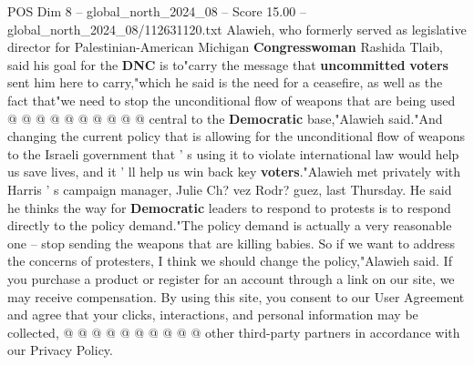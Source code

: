 \begin{textsample}{POS Dim 8 – global\_north\_2024\_08 – Score 15.00 – global\_north\_2024\_08/112631120.txt}
Alawieh, who formerly served as legislative director for Palestinian-American Michigan \textbf{Congresswoman} Rashida Tlaib, said his goal for the \textbf{DNC} is to"carry the message that \textbf{uncommitted} \textbf{voters} sent him here to carry,"which he said is the need for a ceasefire, as well as the fact that"we need to stop the unconditional flow of weapons that are being used @ @ @ @ @ @ @ @ @ @ central to the \textbf{Democratic} base,"Alawieh said."And changing the current policy that is allowing for the unconditional flow of weapons to the Israeli government that ' s using it to violate international law would help us save lives, and it ' ll help us win back key \textbf{voters}."Alawieh met privately with Harris ' s campaign manager, Julie Ch? vez Rodr? guez, last Thursday.
He said he thinks the way for \textbf{Democratic} leaders to respond to protests is to respond directly to the policy demand."The policy demand is actually a very reasonable one -- stop sending the weapons that are killing babies.
So if we want to address the concerns of protesters, I think we should change the policy,"Alawieh said.
If you purchase a product or register for an account through a link on our site, we may receive compensation.
By using this site, you consent to our User Agreement and agree that your clicks, interactions, and personal information may be collected, @ @ @ @ @ @ @ @ @ @ other third-party partners in accordance with our Privacy Policy.

\end{textsample}
